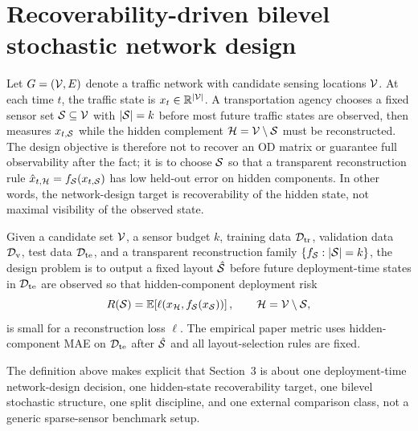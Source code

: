 \section{Recoverability-driven bilevel stochastic network design}
\label{sec:problem}

Let $G=(\mathcal{V},E)$ denote a traffic network with candidate sensing locations $\mathcal{V}$. At each time $t$, the traffic state is $x_t \in \mathbb{R}^{|\mathcal{V}|}$. A transportation agency chooses a fixed sensor set $\mathcal{S} \subseteq \mathcal{V}$ with $|\mathcal{S}|=k$ before most future traffic states are observed, then measures $x_{t,\mathcal{S}}$ while the hidden complement $\mathcal{H}=\mathcal{V}\setminus\mathcal{S}$ must be reconstructed. The design objective is therefore not to recover an OD matrix or guarantee full observability after the fact; it is to choose $\mathcal{S}$ so that a transparent reconstruction rule $\hat{x}_{t,\mathcal{H}}=f_{\mathcal{S}}(x_{t,\mathcal{S}})$ has low held-out error on hidden components. In other words, the network-design target is recoverability of the hidden state, not maximal visibility of the observed state.

\begin{definition}
Given a candidate set $\mathcal{V}$, a sensor budget $k$, training data $\mathcal{D}_{\mathrm{tr}}$, validation data $\mathcal{D}_{\mathrm{v}}$, test data $\mathcal{D}_{\mathrm{te}}$, and a transparent reconstruction family $\{f_{\mathcal{S}}:|\mathcal{S}|=k\}$, the design problem is to output a fixed layout $\hat{\mathcal{S}}$ before future deployment-time states in $\mathcal{D}_{\mathrm{te}}$ are observed so that hidden-component deployment risk
\[
    R(\mathcal{S})=\mathbb{E}\!\left[\ell\!\left(x_{\mathcal{H}}, f_{\mathcal{S}}(x_{\mathcal{S}})\right)\right],
    \qquad \mathcal{H}=\mathcal{V}\setminus\mathcal{S},
\]
is small for a reconstruction loss $\ell$. The empirical paper metric uses hidden-component MAE on $\mathcal{D}_{\mathrm{te}}$ after $\hat{\mathcal{S}}$ and all layout-selection rules are fixed.
\end{definition}

The definition above makes explicit that Section~3 is about one deployment-time network-design decision, one hidden-state recoverability target, one bilevel stochastic structure, one split discipline, and one external comparison class, not a generic sparse-sensor benchmark setup.



